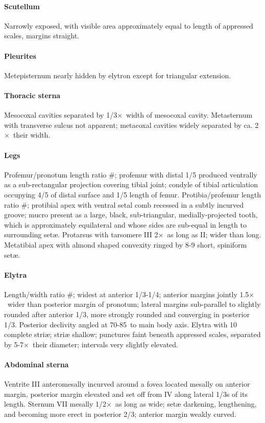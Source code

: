 \documentclass[fleqn,10pt,lineno]{wlpeerj} %
\newcommand{\td}{\textdegree~}
\newcommand{\x}{$\times$~}
\begin{document}
			\paragraph{Scutellum}
				Narrowly exposed, with visible area approximately equal to length of appressed scales, margins straight.
			\paragraph{Pleurites}
				Metepisternum nearly hidden by elytron except for triangular extension.
			\paragraph{Thoracic sterna} 
				Mesocoxal cavities separated by 1/3\x width of mesocoxal cavity. 
				Metasternum with transverse sulcus not apparent; metacoxal cavities widely separated by ca. 2\x their width.
			\paragraph{Legs}
				Profemur/pronotum length ratio \#; profemur with distal 1/5 produced ventrally as a sub-rectangular projection covering tibial joint; condyle of tibial articulation occupying 4/5 of distal surface and 1/5 length of femur. 
				Protibia/profemur length ratio \#; protibial apex with ventral setal comb recessed in a subtly incurved groove; mucro present as a large, black, sub-triangular, medially-projected tooth, which is approximately equilateral and whose sides are sub-equal in length to surrounding set{\ae}. 
				Protarsus with tarsomere III 2\x as long as II; wider than long. 
				Metatibial apex with almond shaped convexity ringed by 8-9 short, spiniform set{\ae}.
			\paragraph{Elytra}
				Length/width ratio \#; widest at anterior 1/3-1/4; anterior margins jointly 1.5\x wider than posterior margin of pronotum; lateral margins sub-parallel to slightly rounded after anterior 1/3, more strongly rounded and converging in posterior 1/3. 
				Posterior declivity angled at 70-85\td to main body axis. Elytra with 10 complete stri{\ae}; stri{\ae} shallow; punctures faint beneath appressed scales, separated by 5-7\x their diameter; intervals very slightly elevated.
			\paragraph{Abdominal sterna}
				Ventrite III anteromesally incurved around a fovea located mesally on anterior margin, posterior margin elevated and set off from IV along lateral 1/3s of its length. 
				Sternum VII mesally 1/2\x as long as wide; set{\ae} darkening, lengthening, and becoming more erect in posterior 2/3; anterior margin weakly curved.
\end{document}
